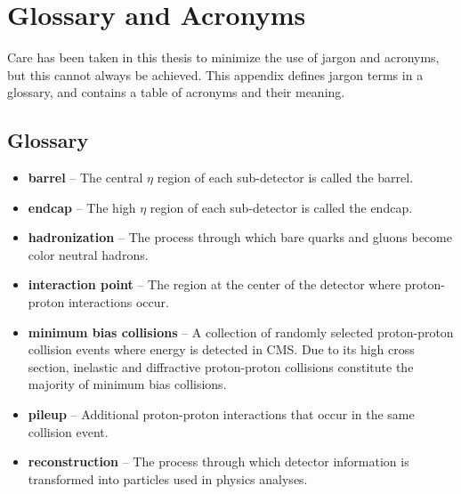 \chapter{Glossary and Acronyms}
\label{app_glossary}
Care has been taken in this thesis to minimize the use of jargon and
acronyms, but this cannot always be achieved.  This appendix defines
jargon terms in a glossary, and contains a table of acronyms and their
meaning.

\section{Glossary}
\label{jargonapp}
\begin{itemize}

	\item \textbf{barrel} -- The central $\eta$ region of each sub-detector is 
		called the barrel.
	\item \textbf{endcap} -- The high $\eta$ region of each sub-detector is 
		called the endcap.
	\item \textbf{hadronization} -- The process through which bare quarks and 
		gluons become color neutral hadrons.
	\item \textbf{interaction point} -- The region at the center of the detector 
		where proton-proton interactions occur.
	\item \textbf{minimum bias collisions} -- A collection of randomly selected 
		proton-proton collision events where energy is detected in CMS.  Due to 
		its high cross section, inelastic and diffractive proton-proton collisions 
		constitute the majority of minimum bias collisions.
	\item \textbf{pileup} -- Additional proton-proton interactions that occur 
		in the same collision event.
	\item \textbf{reconstruction} -- The process through which detector information 
		is transformed into particles used in physics analyses.
\end{itemize}

